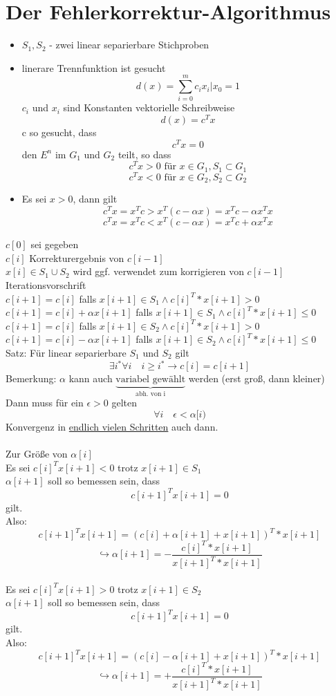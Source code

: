 \documentclass[a4paper,12pt]{scrreprt}
\begin{document}
\section{Der Fehlerkorrektur-Algorithmus}

\begin{itemize}
 \item $S_1,S_2$ - zwei linear separierbare Stichproben
 \item linerare Trennfunktion ist gesucht
 $$ d(x) = \sum_{i=0}^{m} c_i x_i | x_0 = 1 $$
 $c_i$ und $x_i$ sind Konstanten
 vektorielle Schreibweise
  $$ d(x) =  c^T x$$
  c so gesucht, dass\\
  $$ c^T x = 0 $$
  den $E^n$ im $G_1$ und $G_2$ teilt, so dass
  $$ c^Tx > 0 \text{ für } x \in G_1 , S_1 \subset G_1$$
  $$ c^Tx < 0 \text{ für } x \in G_2 , S_2 \subset G_2$$
  \item Es sei $x>0$, dann gilt 
  $$ c^T x = x^T c > x^T(c-\alpha x ) = x^Tc-\alpha x^Tx $$
  $$ c^T x = x^T c < x^T(c- \alpha x ) = x^Tc + \alpha x^Tx $$
\end{itemize}

$c[0]$ sei gegeben\\
$c[i]$ Korrekturergebnis von $c[i-1]$\\
$x[i]\in S_1 \cup S_2$ wird ggf. verwendet zum korrigieren von $c[i-1]$\\
Iterationsvorschrift\\
$c[i+1] = c[i] $ falls $x[i+1] \in S_1 \wedge c[i]^T*x[i+1] > 0$\\
$c[i+1] = c[i] + \alpha x[i+1]$ falls  $x[i+1] \in S_1 \wedge c[i]^T*x[i+1] \leq 0$\\
$c[i+1] = c[i]$ falls $x[i+1] \in S_2 \wedge c[i]^T*x[i+1] > 0$\\
$c[i+1] = c[i] - \alpha x[i+1]$ falls $x[i+1] \in S_2 \wedge c[i]^T*x[i+1] \leq 0$\\
Satz: Für linear separierbare $S_1$ und $S_2$ gilt
$$\exists i^* \forall i\quad i\geq i^* \rightarrow c[i] = c[i+1] $$
Bemerkung: $\alpha$ kann auch $\underbrace{\text{variabel gewählt}}_{\text{abh. von i}}$ werden (erst groß, dann kleiner)\\
Dann muss für ein $\epsilon>0$ gelten
$$\forall i\quad \epsilon < \alpha[i)$$
Konvergenz in \underline{endlich vielen Schritten} auch dann.\\
\\
Zur Größe von $\alpha[i]$\\
Es sei $c[i]^Tx[i+1]<0$ trotz $x[i+1]\in S_1$\\
$\alpha[i+1]$ soll so bemessen sein, dass 
$$c[i+1]^T x[i+1] = 0$$
gilt.\\
Also:
$$c[i+1]^T x[i+1] = (c[i]+\alpha[i+1]+x[i+1])^T * x[i+1]$$
$$\hookrightarrow \alpha[i+1] = - \frac{c[i]^T * x[i+1]}{x[i+1]^T * x[i+1]} $$
\\
Es sei $c[i]^Tx[i+1]>0$ trotz $x[i+1]\in S_2$\\
$\alpha[i+1]$ soll so bemessen sein, dass 
$$c[i+1]^T x[i+1] = 0$$
gilt.\\
Also:
$$c[i+1]^T x[i+1] = (c[i]-\alpha[i+1]+x[i+1])^T * x[i+1]$$
$$\hookrightarrow \alpha[i+1] = + \frac{c[i]^T * x[i+1]}{x[i+1]^T * x[i+1]} $$
\end{document}
